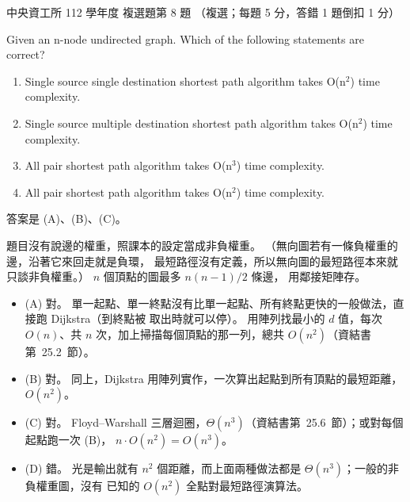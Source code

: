 \begin{pastexam}[label={px:ncu-112-dsa-08}]{中央資工所 112 學年度 複選題第 8 題}
（複選；每題 5 分，答錯 1 題倒扣 1 分）

Given an n-node undirected graph. Which of the following statements are correct?
\begin{enumerate}[label=(\Alph*)]
\item Single source single destination shortest path algorithm takes O(n$^2$) time complexity.
\item Single source multiple destination shortest path algorithm takes O(n$^2$) time complexity.
\item All pair shortest path algorithm takes O(n$^3$) time complexity.
\item All pair shortest path algorithm takes O(n$^2$) time complexity.
\end{enumerate}
\end{pastexam}

\begin{pastsoln}
答案是 (A)、(B)、(C)。

題目沒有說邊的權重，照課本的設定當成非負權重。 （無向圖若有一條負權重的邊，沿著它來回走就是負環，
最短路徑沒有定義，所以無向圖的最短路徑本來就只談非負權重。） $n$ 個頂點的圖最多 $n(n - 1)/2$ 條邊，
用鄰接矩陣存。
\begin{itemize}
\item (A) 對。 單一起點、單一終點沒有比單一起點、所有終點更快的一般做法，直接跑 Dijkstra（到終點被
取出時就可以停）。 用陣列找最小的 $d$ 值，每次 $O(n)$、共 $n$ 次，加上掃描每個頂點的那一列，總共
$O(n^2)$（資結書第~25.2~節）。
\item (B) 對。 同上，Dijkstra 用陣列實作，一次算出起點到所有頂點的最短距離，$O(n^2)$。
\item (C) 對。 Floyd--Warshall 三層迴圈，$\Theta(n^3)$（資結書第~25.6~節）；或對每個起點跑一次 (B)，
$n \cdot O(n^2) = O(n^3)$。
\item (D) 錯。 光是輸出就有 $n^2$ 個距離，而上面兩種做法都是 $\Theta(n^3)$；一般的非負權重圖，沒有
已知的 $O(n^2)$ 全點對最短路徑演算法。
\end{itemize}
\end{pastsoln}
